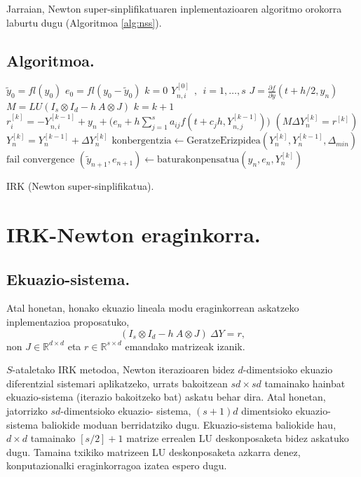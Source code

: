 Jarraian, Newton super-sinplifikatuaren inplementazioaren algoritmo orokorra laburtu dugu (Algoritmoa \ref{alg:nss}).

\subsection*{Algoritmoa.}

\begin{algorithm}[H]
 \BlankLine
  $\tilde{y}_0=fl(y_0)$\;
  $e_0=fl(y_0-\tilde{y}_0)$\;
  {
   \BlankLine
   $k=0$\;
    $Y_{n,i}^{[0]} \ \ , \ \ i=1,\dots,s $\;
   \BlankLine
   $J=\frac{\partial f}{\partial y}(t+h/2,y_n) $\; 
   $M=LU(I_s \otimes I_d - h \ A \otimes J)$\;
   \BlankLine
   {
    \BlankLine 
    $k=k+1$\;
    $r_i^{[k]}=-Y_{n,i}^{[k-1]}+y_n+\big(e_n+h \sum\limits_{j=1}^{s} a_{ij} f(t+c_jh,Y_{n,j}^{[k-1]})\big) $\;
     $(M \Delta Y_n^{[k]}=r^{[k]})$\;
    $Y_n^{[k]}=Y_n^{[k-1]}+\Delta Y_n^{[k]}$\;
    $\text{konbergentzia} \leftarrow \text{GeratzeErizpidea}(Y_n^{[k]},Y_n^{[k-1]},\Delta_{min}) $\;
   }
   \BlankLine
   {
     {$\text{fail convergence}$\;}
   }
   {$(\tilde y_{n+1},e_{n+1})\leftarrow \text{baturakonpensatua}(y_n,e_n,Y_n^{[k]})$\;}    
 }
 \caption{IRK (Newton super-sinplifikatua).}
 \label{alg:nss}
\end{algorithm}



\section{IRK-Newton eraginkorra.}
\label{sec:7.3}

\subsection{Ekuazio-sistema.}

Atal honetan, honako ekuazio lineala modu eraginkorrean askatzeko inplementazioa proposatuko,
\begin{equation}
\label{eq:linsys}
(I_s \otimes I_d - h \ A \otimes J) \ \Delta Y = r,
\end{equation}
non $J \in \mathbb{R}^{d \times d}$  eta $r \in \mathbb{R}^{s \times d}$ emandako matrizeak izanik.

$S$-ataletako IRK metodoa, Newton iterazioaren bidez $d$-dimentsioko ekuazio diferentzial sistemari aplikatzeko, urrats bakoitzean $sd \times sd$ tamainako hainbat ekuazio-sistema (iterazio bakoitzeko bat) askatu behar dira. Atal honetan, jatorrizko $sd$-dimentsioko ekuazio- sistema, $(s+1)d$ dimentsioko ekuazio-sistema baliokide moduan berridatziko dugu. Ekuazio-sistema baliokide hau,  $d \times d$ tamainako $[s/2]+1$ matrize errealen LU deskonposaketa bidez askatuko dugu. Tamaina txikiko matrizeen LU deskonposaketa azkarra denez, konputazionalki eraginkorragoa izatea espero dugu.      

